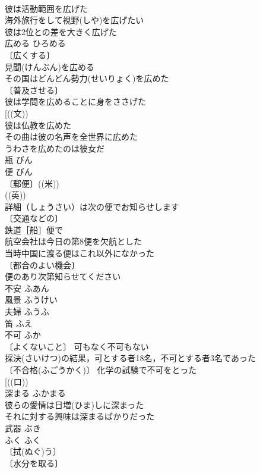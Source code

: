 \documentclass[8pt]{extreport}
\begin{document}
\begin{CJK}{UTF8}{min}
\\	彼は活動範囲を広げた 
\\	海外旅行をして視野(しや)を広げたい 
\\	彼は2位との差を大きく広げた 
\\	広める	ひろめる　
\\	〔広くする〕
\\	見聞(けんぶん)を広める 
\\	その国はどんどん勢力(せいりょく)を広めた 
\\	〔普及させる〕
\\	彼は学問を広めることに身をささげた 
\\	[((文))
\\	彼は仏教を広めた 
\\	その曲は彼の名声を全世界に広めた 
\\	うわさを広めたのは彼女だ 
\\	瓶	びん	
\\	便	びん	
\\	〔郵便〕((米)) 
\\	((英)) 
\\	詳細（しょうさい）は次の便でお知らせします 
\\	〔交通などの〕　
\\	鉄道［船］便で 
\\	航空会社は今日の第8便を欠航とした 
\\	当時中国に渡る便はこれ以外になかった 
\\	〔都合のよい機会〕
\\	便のあり次第知らせてください 
\\	不安	ふあん	
\\	風景	ふうけい	
\\	夫婦	ふうふ	
\\	笛	ふえ	
\\	不可	ふか	
\\	〔よくないこと〕 可もなく不可もない 
\\	採決(さいけつ)の結果，可とする者18名，不可とする者3名であった 
\\	〔不合格(ふごうかく)〕 化学の試験で不可をとった 
\\	[((口)) 
\\	深まる	ふかまる	
\\	彼らの愛情は日増(ひま)しに深まった 
\\	それに対する興味は深まるばかりだった 
\\	武器	ぶき	
\\	ふく	ふく	
\\	〔拭(ぬぐ)う〕
\\	〔水分を取る〕

\end{CJK}
\end{document}
